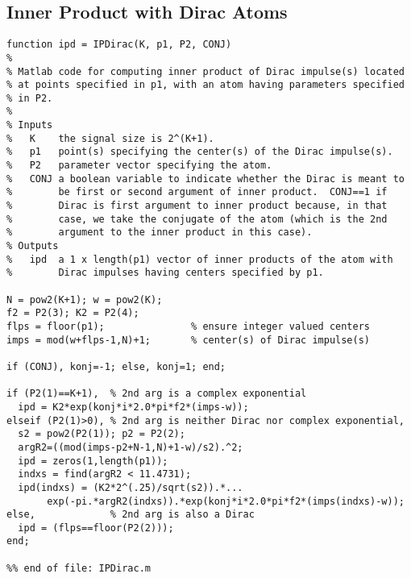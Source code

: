 \subsection{Inner Product with Dirac Atoms}
\begin{verbatim}
function ipd = IPDirac(K, p1, P2, CONJ)
%
% Matlab code for computing inner product of Dirac impulse(s) located
% at points specified in p1, with an atom having parameters specified
% in P2.
%
% Inputs
%   K    the signal size is 2^(K+1).
%   p1   point(s) specifying the center(s) of the Dirac impulse(s).
%   P2   parameter vector specifying the atom.
%   CONJ a boolean variable to indicate whether the Dirac is meant to
%        be first or second argument of inner product.  CONJ==1 if
%        Dirac is first argument to inner product because, in that
%        case, we take the conjugate of the atom (which is the 2nd
%        argument to the inner product in this case).
% Outputs
%   ipd  a 1 x length(p1) vector of inner products of the atom with
%        Dirac impulses having centers specified by p1.

N = pow2(K+1); w = pow2(K);
f2 = P2(3); K2 = P2(4);
flps = floor(p1);               % ensure integer valued centers
imps = mod(w+flps-1,N)+1;       % center(s) of Dirac impulse(s)

if (CONJ), konj=-1; else, konj=1; end; 

if (P2(1)==K+1),  % 2nd arg is a complex exponential
  ipd = K2*exp(konj*i*2.0*pi*f2*(imps-w));
elseif (P2(1)>0), % 2nd arg is neither Dirac nor complex exponential,
  s2 = pow2(P2(1)); p2 = P2(2); 
  argR2=((mod(imps-p2+N-1,N)+1-w)/s2).^2; 
  ipd = zeros(1,length(p1));
  indxs = find(argR2 < 11.4731); 
  ipd(indxs) = (K2*2^(.25)/sqrt(s2)).*...
       exp(-pi.*argR2(indxs)).*exp(konj*i*2.0*pi*f2*(imps(indxs)-w));
else,             % 2nd arg is also a Dirac
  ipd = (flps==floor(P2(2)));
end;

%% end of file: IPDirac.m
\end{verbatim}   


